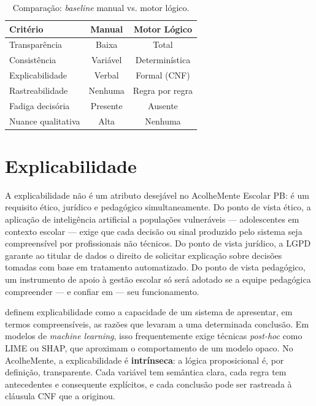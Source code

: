 \documentclass[
    12pt,
    openright,
    oneside,
    a4paper,
    english,
    brazil
]{abntex2}
\begin{document}
\begin{table}[H]
\centering
\caption{Comparação: \textit{baseline} manual vs. motor lógico.}
\label{tab:baseline}
\begin{tabular}{lcc}
\toprule
\textbf{Critério} & \textbf{Manual} & \textbf{Motor Lógico} \\
\midrule
Transparência     & Baixa      & Total \\
Consistência      & Variável   & Determinística \\
Explicabilidade   & Verbal     & Formal (CNF) \\
Rastreabilidade   & Nenhuma    & Regra por regra \\
Fadiga decisória  & Presente   & Ausente \\
Nuance qualitativa & Alta      & Nenhuma \\
\bottomrule
\end{tabular}
\end{table}

\chapter{Explicabilidade}

A explicabilidade não é um atributo desejável no AcolheMente Escolar PB: é um requisito ético, jurídico e pedagógico simultaneamente. Do ponto de vista ético, a aplicação de inteligência artificial a populações vulneráveis --- adolescentes em contexto escolar --- exige que cada decisão ou sinal produzido pelo sistema seja compreensível por profissionais não técnicos. Do ponto de vista jurídico, a LGPD \cite{brasil_lgpd_2018} garante ao titular de dados o direito de solicitar explicação sobre decisões tomadas com base em tratamento automatizado. Do ponto de vista pedagógico, um instrumento de apoio à gestão escolar só será adotado se a equipe pedagógica compreender --- e confiar em --- seu funcionamento.

 definem explicabilidade como a capacidade de um sistema de apresentar, em termos compreensíveis, as razões que levaram a uma determinada conclusão. Em modelos de \textit{machine learning}, isso frequentemente exige técnicas \textit{post-hoc} como LIME ou SHAP, que aproximam o comportamento de um modelo opaco. No AcolheMente, a explicabilidade é \textbf{intrínseca}: a lógica proposicional é, por definição, transparente. Cada variável tem semântica clara, cada regra tem antecedentes e consequente explícitos, e cada conclusão pode ser rastreada à cláusula CNF que a originou.
\end{document}
